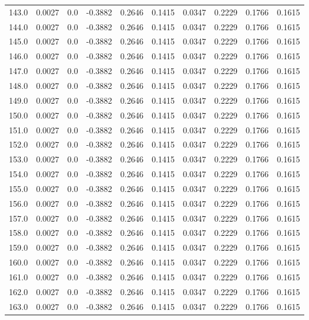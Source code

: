 \begin{longtable}{lrrrrrrrrr}
143.0 & 0.0027 & 0.0 & -0.3882 & 0.2646 & 0.1415 & 0.0347 & 0.2229 & 0.1766 & 0.1615 \\
144.0 & 0.0027 & 0.0 & -0.3882 & 0.2646 & 0.1415 & 0.0347 & 0.2229 & 0.1766 & 0.1615 \\
145.0 & 0.0027 & 0.0 & -0.3882 & 0.2646 & 0.1415 & 0.0347 & 0.2229 & 0.1766 & 0.1615 \\
146.0 & 0.0027 & 0.0 & -0.3882 & 0.2646 & 0.1415 & 0.0347 & 0.2229 & 0.1766 & 0.1615 \\
147.0 & 0.0027 & 0.0 & -0.3882 & 0.2646 & 0.1415 & 0.0347 & 0.2229 & 0.1766 & 0.1615 \\
148.0 & 0.0027 & 0.0 & -0.3882 & 0.2646 & 0.1415 & 0.0347 & 0.2229 & 0.1766 & 0.1615 \\
149.0 & 0.0027 & 0.0 & -0.3882 & 0.2646 & 0.1415 & 0.0347 & 0.2229 & 0.1766 & 0.1615 \\
150.0 & 0.0027 & 0.0 & -0.3882 & 0.2646 & 0.1415 & 0.0347 & 0.2229 & 0.1766 & 0.1615 \\
151.0 & 0.0027 & 0.0 & -0.3882 & 0.2646 & 0.1415 & 0.0347 & 0.2229 & 0.1766 & 0.1615 \\
152.0 & 0.0027 & 0.0 & -0.3882 & 0.2646 & 0.1415 & 0.0347 & 0.2229 & 0.1766 & 0.1615 \\
153.0 & 0.0027 & 0.0 & -0.3882 & 0.2646 & 0.1415 & 0.0347 & 0.2229 & 0.1766 & 0.1615 \\
154.0 & 0.0027 & 0.0 & -0.3882 & 0.2646 & 0.1415 & 0.0347 & 0.2229 & 0.1766 & 0.1615 \\
155.0 & 0.0027 & 0.0 & -0.3882 & 0.2646 & 0.1415 & 0.0347 & 0.2229 & 0.1766 & 0.1615 \\
156.0 & 0.0027 & 0.0 & -0.3882 & 0.2646 & 0.1415 & 0.0347 & 0.2229 & 0.1766 & 0.1615 \\
157.0 & 0.0027 & 0.0 & -0.3882 & 0.2646 & 0.1415 & 0.0347 & 0.2229 & 0.1766 & 0.1615 \\
158.0 & 0.0027 & 0.0 & -0.3882 & 0.2646 & 0.1415 & 0.0347 & 0.2229 & 0.1766 & 0.1615 \\
159.0 & 0.0027 & 0.0 & -0.3882 & 0.2646 & 0.1415 & 0.0347 & 0.2229 & 0.1766 & 0.1615 \\
160.0 & 0.0027 & 0.0 & -0.3882 & 0.2646 & 0.1415 & 0.0347 & 0.2229 & 0.1766 & 0.1615 \\
161.0 & 0.0027 & 0.0 & -0.3882 & 0.2646 & 0.1415 & 0.0347 & 0.2229 & 0.1766 & 0.1615 \\
162.0 & 0.0027 & 0.0 & -0.3882 & 0.2646 & 0.1415 & 0.0347 & 0.2229 & 0.1766 & 0.1615 \\
163.0 & 0.0027 & 0.0 & -0.3882 & 0.2646 & 0.1415 & 0.0347 & 0.2229 & 0.1766 & 0.1615 \\

\end{longtable}
